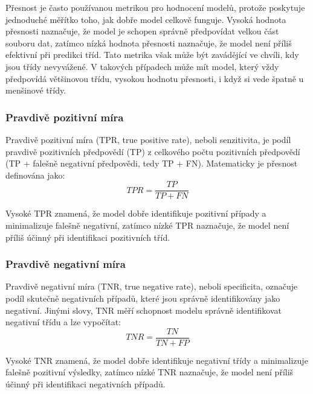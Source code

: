 Přesnost je často používanou metrikou pro hodnocení modelů, protože poskytuje
jednoduché měřítko toho, jak dobře model celkově funguje. Vysoká hodnota
přesnosti naznačuje, že model je schopen správně předpovídat velkou část souboru
dat, zatímco nízká hodnota přesnosti naznačuje, že model není příliš efektivní
při predikci tříd. Tato metrika však může být zavádějící ve chvíli, kdy jsou
třídy nevyvážené. V takových případech může mít model, který vždy předpovídá
většinovou třídu, vysokou hodnotu přesnosti, i když si vede špatně u menšinové
třídy.

\subsubsection{Pravdivě pozitivní míra}
Pravdivě pozitivní míra (\gls{TPR}, true positive rate), neboli senzitivita, je
podíl pravdivě pozitivních předpovědí (TP) z celkového počtu pozitivních
předpovědí (TP + falešně negativní předpovědi, tedy TP + FN). Matematicky je
přesnost definována jako:
\begin{equation}
    TPR = \frac{TP}{TP + FN}
\end{equation}

Vysoké \gls{TPR} znamená, že model dobře identifikuje pozitivní případy a
minimalizuje falešně negativní, zatímco nízké \gls{TPR} naznačuje, že model není
příliš účinný při identifikaci pozitivních tříd.

\subsubsection{Pravdivě negativní míra}
Pravdivě negativní míra (\gls{TNR}, true negative rate), neboli specificita,
označuje podíl skutečně negativních případů, které jsou správně identifikovány
jako negativní. Jinými slovy, \gls{TNR} měří schopnost modelu správně
identifikovat negativní třídu a lze vypočítat:
\begin{equation}
    TNR = \frac{TN}{TN + FP}
\end{equation}

Vysoké \gls{TNR} znamená, že model dobře identifikuje negativní třídy a
minimalizuje falešně pozitivní výsledky, zatímco nízké \gls{TNR} naznačuje, že
model není příliš účinný při identifikaci negativních případů.


